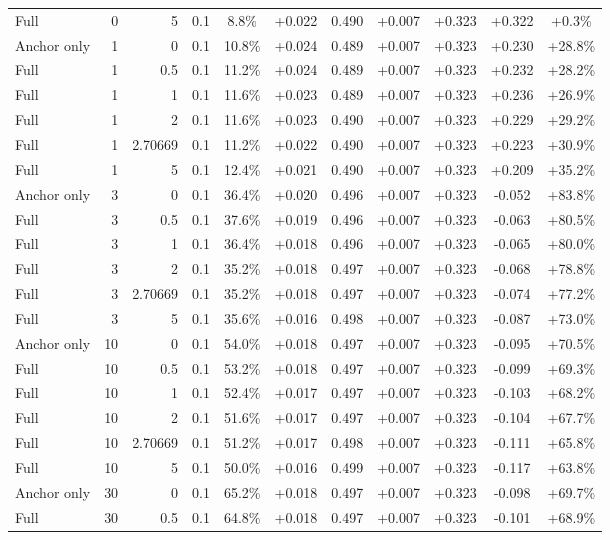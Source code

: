 \begin{table}[htbp]
\begin{tabular}{lrrrccccccc}
Full & 0 & 5 & 0.1 & 8.8\% & +0.022 & 0.490 & +0.007 & +0.323 & +0.322 & +0.3\% \\
Anchor only & 1 & 0 & 0.1 & 10.8\% & +0.024 & 0.489 & +0.007 & +0.323 & +0.230 & +28.8\% \\
Full & 1 & 0.5 & 0.1 & 11.2\% & +0.024 & 0.489 & +0.007 & +0.323 & +0.232 & +28.2\% \\
Full & 1 & 1 & 0.1 & 11.6\% & +0.023 & 0.489 & +0.007 & +0.323 & +0.236 & +26.9\% \\
Full & 1 & 2 & 0.1 & 11.6\% & +0.023 & 0.490 & +0.007 & +0.323 & +0.229 & +29.2\% \\
Full & 1 & 2.70669 & 0.1 & 11.2\% & +0.022 & 0.490 & +0.007 & +0.323 & +0.223 & +30.9\% \\
Full & 1 & 5 & 0.1 & 12.4\% & +0.021 & 0.490 & +0.007 & +0.323 & +0.209 & +35.2\% \\
Anchor only & 3 & 0 & 0.1 & 36.4\% & +0.020 & 0.496 & +0.007 & +0.323 & -0.052 & +83.8\% \\
Full & 3 & 0.5 & 0.1 & 37.6\% & +0.019 & 0.496 & +0.007 & +0.323 & -0.063 & +80.5\% \\
Full & 3 & 1 & 0.1 & 36.4\% & +0.018 & 0.496 & +0.007 & +0.323 & -0.065 & +80.0\% \\
Full & 3 & 2 & 0.1 & 35.2\% & +0.018 & 0.497 & +0.007 & +0.323 & -0.068 & +78.8\% \\
Full & 3 & 2.70669 & 0.1 & 35.2\% & +0.018 & 0.497 & +0.007 & +0.323 & -0.074 & +77.2\% \\
Full & 3 & 5 & 0.1 & 35.6\% & +0.016 & 0.498 & +0.007 & +0.323 & -0.087 & +73.0\% \\
Anchor only & 10 & 0 & 0.1 & 54.0\% & +0.018 & 0.497 & +0.007 & +0.323 & -0.095 & +70.5\% \\
Full & 10 & 0.5 & 0.1 & 53.2\% & +0.018 & 0.497 & +0.007 & +0.323 & -0.099 & +69.3\% \\
Full & 10 & 1 & 0.1 & 52.4\% & +0.017 & 0.497 & +0.007 & +0.323 & -0.103 & +68.2\% \\
Full & 10 & 2 & 0.1 & 51.6\% & +0.017 & 0.497 & +0.007 & +0.323 & -0.104 & +67.7\% \\
Full & 10 & 2.70669 & 0.1 & 51.2\% & +0.017 & 0.498 & +0.007 & +0.323 & -0.111 & +65.8\% \\
Full & 10 & 5 & 0.1 & 50.0\% & +0.016 & 0.499 & +0.007 & +0.323 & -0.117 & +63.8\% \\
Anchor only & 30 & 0 & 0.1 & 65.2\% & +0.018 & 0.497 & +0.007 & +0.323 & -0.098 & +69.7\% \\
Full & 30 & 0.5 & 0.1 & 64.8\% & +0.018 & 0.497 & +0.007 & +0.323 & -0.101 & +68.9\% \\

\end{tabular}
\end{table}
